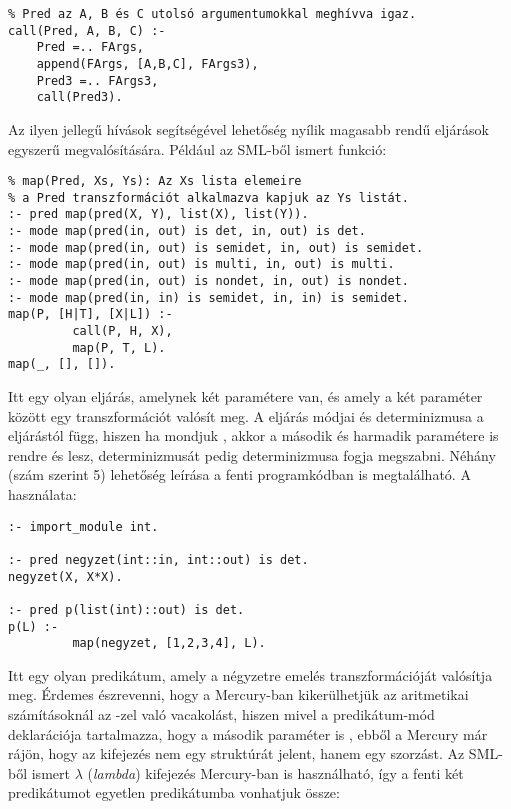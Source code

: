 \begin{verbatim}
% Pred az A, B és C utolsó argumentumokkal meghívva igaz.
call(Pred, A, B, C) :- 
    Pred =.. FArgs, 
    append(FArgs, [A,B,C], FArgs3), 
    Pred3 =.. FArgs3,
    call(Pred3).
\end{verbatim}

Az ilyen jellegű  hívások segítségével lehetőség nyílik magasabb rendű
eljárások egyszerű megvalósítására. Például az SML-ből ismert  funkció:

\begin{verbatim}
% map(Pred, Xs, Ys): Az Xs lista elemeire 
% a Pred transzformációt alkalmazva kapjuk az Ys listát.
:- pred map(pred(X, Y), list(X), list(Y)).
:- mode map(pred(in, out) is det, in, out) is det.
:- mode map(pred(in, out) is semidet, in, out) is semidet.
:- mode map(pred(in, out) is multi, in, out) is multi.
:- mode map(pred(in, out) is nondet, in, out) is nondet.
:- mode map(pred(in, in) is semidet, in, in) is semidet.
map(P, [H|T], [X|L]) :-
         call(P, H, X),
         map(P, T, L).
map(_, [], []).
\end{verbatim}

Itt  egy olyan eljárás, amelynek két paramétere van, és amely a két
paraméter között egy transzformációt valósít meg. A  eljárás módjai
és determinizmusa a  eljárástól függ, hiszen ha  mondjuk
, akkor a  második és harmadik paramétere
is rendre  és  lesz,  determinizmusát pedig 
determinizmusa fogja megszabni. Néhány (szám szerint 5) lehetőség leírása a
fenti programkódban is megtalálható. A  használata:

\begin{verbatim}
:- import_module int.

:- pred negyzet(int::in, int::out) is det.
negyzet(X, X*X).

:- pred p(list(int)::out) is det.
p(L) :-
         map(negyzet, [1,2,3,4], L).
\end{verbatim}

Itt  egy olyan predikátum, amely a négyzetre emelés transzformációját
valósítja meg. Érdemes észrevenni, hogy a Mercury-ban kikerülhetjük az aritmetikai
számításoknál az -zel való vacakolást, hiszen mivel a 
predikátum-mód deklarációja tartalmazza, hogy a második paraméter is ,
ebből a Mercury már rájön, hogy az  kifejezés nem egy  struktúrát
jelent, hanem egy szorzást.
\br
Az SML-ből ismert $\lambda$ (\emph{lambda}) kifejezés Mercury-ban is használható,
így a fenti két predikátumot egyetlen predikátumba vonhatjuk össze:

